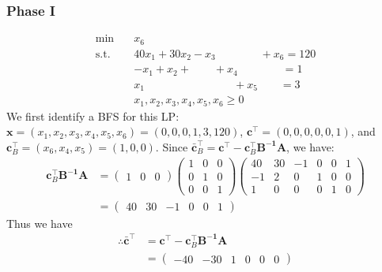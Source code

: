 \documentclass[12pt]{article}
\begin{document}
\subsubsection*{Phase I}

\begin{align*}
    \min \quad & x_{6} \\ 
    \text{s.t.} \quad & 40 x_{1} + 30 x_{2} - x_{3} \quad \quad \quad \quad + x_{6} = 120 \\ 
    & - x_{1} + x_{2} + \quad \quad + x_{4} \quad \quad \quad \quad = 1 \\ 
    & x_{1} \quad \quad \quad \quad \quad \quad \quad \quad + x_{5} \quad \quad = 3 \\ 
    & x_{1}, x_{2}, x_{3}, x_{4}, x_{5}, x_{6} \geq 0
\end{align*} We first identify a BFS for this LP: $\mathbf{x} = (x_{1}, x_{2}, x_{3},x_{4},x_{5},x_{6}) = (0, 0, 0, 1, 3, 120)$, $\mathbf{c}^{\top} = (0, 0, 0, 0, 0, 1)$, and $\mathbf{c}_B^{\top} = (x_{6},x_{4},x_{5}) = (1,0,0)$. Since $\mathbf{\bar{c}}_B^{\top} = \mathbf{c}^{\top} - \mathbf{c}_B^{\top}\mathbf{B^{-1}A}$, we have: \\ \begin{align*}
    \mathbf{c}_B^{\top}\mathbf{B^{-1}A} &= \begin{pmatrix}
        1 & 0 & 0
    \end{pmatrix} \begin{pmatrix}
        1 & 0 & 0 \\ 
        0 & 1 & 0 \\ 
        0 & 0 & 1
    \end{pmatrix} \begin{pmatrix}
        40 & 30 & -1 & 0 & 0 & 1 \\ 
        -1 & 2 & 0 & 1 & 0 & 0 \\ 
        1 & 0 & 0 & 0 & 1 & 0
    \end{pmatrix} \\ 
    &= \begin{pmatrix}
        40 & 30 & -1 & 0 & 0 & 1
    \end{pmatrix}
\end{align*} Thus we have \begin{align*}
    \therefore \mathbf{\bar{c}}^{\top} &= \mathbf{c}^{\top} - \mathbf{c}^{\top}_B \mathbf{B^{-1}A} \\ 
    &= \begin{pmatrix}
        -40 & -30 & 1 & 0 & 0 & 0
    \end{pmatrix}
\end{align*}
\end{document}
